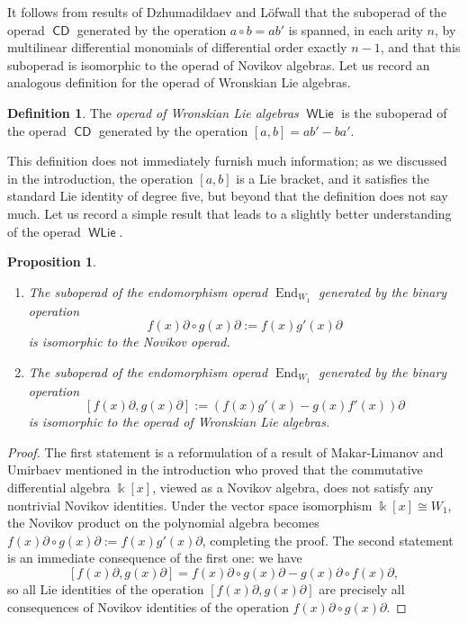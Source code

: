 \documentclass[11pt,reqno]{amsart}
\theoremstyle{plain}
\newtheorem{proposition}[theorem]{Proposition}
\theoremstyle{definition}
\newtheorem{definition}[theorem]{Definition}
\theoremstyle{remark}
\newcommand{\bk}{\Bbbk}
\DeclareMathOperator{\CDi}{\mathsf{CD}}
\DeclareMathOperator{\WLie}{\mathsf{WLie}}
\DeclareMathOperator{\End}{End}
\begin{document}
It follows from results of Dzhumadildaev and Löfwall \cite{DL} that the suboperad of the operad $\CDi$ generated by the operation $a\circ b=ab'$ is spanned, in each arity $n$, by multilinear differential monomials of differential order exactly $n-1$, and that this suboperad is isomorphic to the operad of Novikov algebras. Let us record an analogous definition for the operad of Wronskian Lie algebras.

\begin{definition}
The \emph{operad of Wronskian Lie algebras} $\WLie$ is the suboperad of the operad $\CDi$ generated by the operation $[a,b]=ab'-ba'$. 
\end{definition}

This definition does not immediately furnish much information; as we discussed in the introduction, the operation $[a,b]$ is a Lie bracket, and it satisfies the standard Lie identity of degree five, but beyond that the definition does not say much. Let us record a simple result that leads to a slightly better understanding of the operad $\WLie$. 

\begin{proposition}\label{prop:suboperads}\leavevmode
\begin{enumerate}
\item The suboperad of the endomorphism operad $\End_{W_1}$ generated by the binary operation 
 \[
 f(x)\partial\circ g(x)\partial:=f(x)g'(x)\partial    
 \]
is isomorphic to the Novikov operad. 
\item The suboperad of the endomorphism operad $\End_{W_1}$ generated by the binary operation 
 \[
[f(x)\partial,g(x)\partial]:=(f(x)g'(x)-g(x)f'(x))\partial     
 \]
is isomorphic to the operad of Wronskian Lie algebras.
\end{enumerate}
\end{proposition}

\begin{proof}
The first statement is a reformulation of a result of Makar-Limanov and Umirbaev \cite{MR2884985} mentioned in the introduction who proved that the commutative differential algebra $\bk[x]$, viewed as a Novikov algebra, does not satisfy any nontrivial Novikov identities. Under the vector space isomorphism $\bk[x]\cong W_1$, the Novikov product on the polynomial algebra becomes $f(x)\partial\circ g(x)\partial:=f(x)g'(x)\partial$, completing the proof. 
The second statement is an immediate consequence of the first one: we have 
 \[
[f(x)\partial,g(x)\partial]=f(x)\partial\circ g(x)\partial-g(x)\partial\circ f(x)\partial,     
 \]
so all Lie identities of the operation $[f(x)\partial,g(x)\partial]$ are precisely all consequences of Novikov identities of the operation $f(x)\partial\circ g(x)\partial$.
\end{proof}
\end{document}
